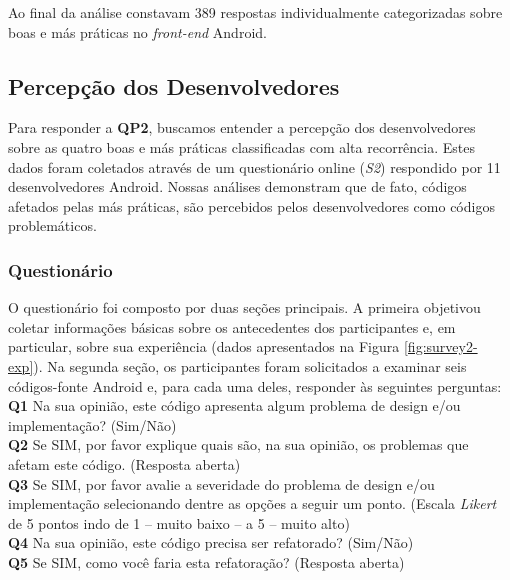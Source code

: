 Ao final da análise constavam 389 respostas individualmente categorizadas sobre boas e más práticas no \textit{front-end} Android.




\subsection{Percepção dos Desenvolvedores}

Para responder a \textbf{QP2}, buscamos entender a percepção dos desenvolvedores sobre as quatro boas e más práticas classificadas com alta recorrência. Estes dados foram coletados através de um questionário online (\textit{S2}) respondido por 11 desenvolvedores Android. Nossas análises demonstram que de fato, códigos afetados pelas más práticas, são percebidos pelos desenvolvedores como códigos problemáticos.

\subsubsection{Questionário}
\label{sub:perception-survey}


O questionário foi composto por duas seções principais. A primeira objetivou coletar informações básicas sobre os antecedentes dos participantes e, em particular, sobre sua experiência (dados apresentados na Figura \ref{fig:survey2-exp}). Na segunda seção, os participantes foram solicitados a examinar seis códigos-fonte Android e, para cada uma deles, responder às seguintes perguntas: \\

\noindent
\textbf{Q1} Na sua opinião, este código apresenta algum problema de design e/ou implementação? (Sim/Não) \\

\noindent
\textbf{Q2} Se SIM, por favor explique quais são, na sua opinião, os problemas que afetam este código. (Resposta aberta) \\

\noindent
\textbf{Q3} Se SIM, por favor avalie a severidade do problema de design e/ou implementação selecionando dentre as opções a seguir um ponto. (Escala \textit{Likert} de 5 pontos indo de 1 -- muito baixo -- a 5 -- muito alto) \\

\noindent
\textbf{Q4} Na sua opinião, este código precisa ser refatorado? (Sim/Não) \\

\noindent
\textbf{Q5} Se SIM, como você faria esta refatoração? (Resposta aberta) \\

